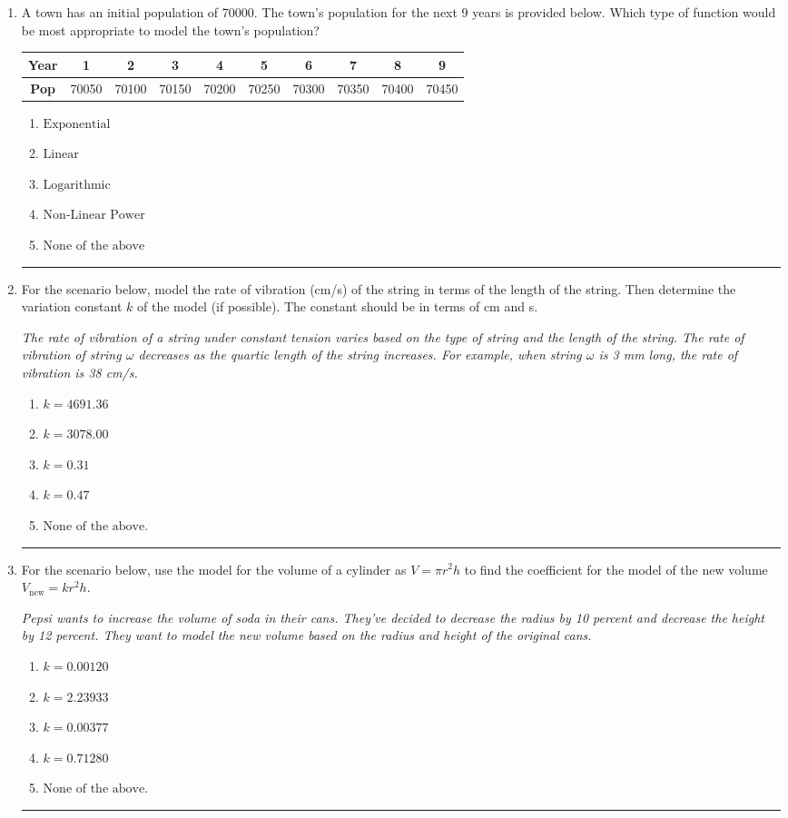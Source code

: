 \documentclass[14pt]{extbook}
\newcommand{\litem}[1]{\item#1\hspace*{-1cm}\rule{\textwidth}{0.4pt}}
\begin{document}
\begin{enumerate}
\litem{
A town has an initial population of 70000. The town's population for the next 9 years is provided below. Which type of function would be most appropriate to model the town's population?

\begin{tabular}{c|c|c|c|c|c|c|c|c|c}
\textbf{Year} &1 &2 &3 &4 &5 &6 &7 &8 &9\tabularnewline \hline
\textbf{Pop} &70050 &70100 &70150 &70200 &70250 &70300 &70350 &70400 &70450\end{tabular}\begin{enumerate}[label=\Alph*.]
\item \( \text{Exponential} \)
\item \( \text{Linear} \)
\item \( \text{Logarithmic} \)
\item \( \text{Non-Linear Power} \)
\item \( \text{None of the above} \)

\end{enumerate} }
\litem{
For the scenario below, model the rate of vibration (cm/s) of the string in terms of the length of the string. Then determine the variation constant $k$ of the model (if possible). The constant should be in terms of cm and s.
\begin{center}
    \textit{ The rate of vibration of a string under constant tension varies based on the type of string and the length of the string. The rate of vibration of string $\omega$ decreases as the quartic length of the string increases. For example, when string $\omega$ is 3 mm long, the rate of vibration is 38 cm/s. }
\end{center}
\begin{enumerate}[label=\Alph*.]
\item \( k = 4691.36 \)
\item \( k = 3078.00 \)
\item \( k = 0.31 \)
\item \( k = 0.47 \)
\item \( \text{None of the above.} \)

\end{enumerate} }
\litem{
For the scenario below, use the model for the volume of a cylinder as $V = \pi r^2 h$ to find the coefficient for the model of the new volume $V_{\text{new}} = k r^2 h$.
\begin{center}
    \textit{ Pepsi wants to increase the volume of soda in their cans. They've decided to decrease the radius by 10 percent and decrease the height by 12 percent. They want to model the new volume based on the radius and height of the original cans. }
\end{center}
\begin{enumerate}[label=\Alph*.]
\item \( k = 0.00120 \)
\item \( k = 2.23933 \)
\item \( k = 0.00377 \)
\item \( k = 0.71280 \)
\item \( \text{None of the above.} \)


\end{enumerate}}
\end{enumerate}
\end{document}
